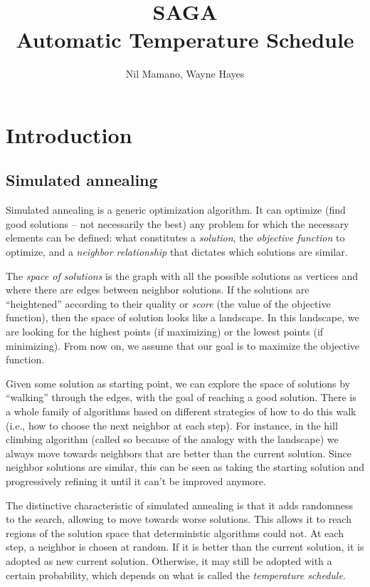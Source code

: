 \documentclass[]{article}
\title{SAGA\\Automatic Temperature Schedule}
\author{Nil Mamano, Wayne Hayes}
\begin{document}
\maketitle


\section{Introduction}

\subsection{Simulated annealing}
Simulated annealing is a generic optimization algorithm. It can optimize (find good solutions -- not necessarily the best) any problem for which the necessary elements can be defined: what constitutes a \textit{solution}, the \textit{objective function} to optimize, and a \textit{neighbor relationship} that dictates which solutions are similar.

The \textit{space of solutions} is the graph with all the possible solutions as vertices and where there are edges between neighbor solutions. If the solutions are ``heightened'' according to their quality or \textit{score} (the value of the objective function), then the space of solution looks like a landscape. In this landscape, we are looking for the highest points (if maximizing) or the lowest points (if minimizing). From now on, we assume that our goal is to maximize the objective function.

Given some solution as starting point, we can explore the space of solutions by ``walking'' through the edges, with the goal of reaching a good solution. There is a whole family of algorithms based on different strategies of how to do this walk (i.e., how to choose the next neighbor at each step). For instance, in the hill climbing algorithm (called so because of the analogy with the landscape) we always move towards neighbors that are better than the current solution. Since neighbor solutions are similar, this can be seen as taking the starting solution and progressively refining it until it can't be improved anymore.

The distinctive characteristic of simulated annealing is that it adds randomness to the search, allowing to move towards worse solutions. This allows it to reach regions of the solution space that deterministic algorithms could not. At each step, a neighbor is chosen at random. If it is better than the current solution, it is adopted as new current solution. Otherwise, it may still be adopted with a certain probability, which depends on what is called the \textit{temperature schedule}.
\end{document}
